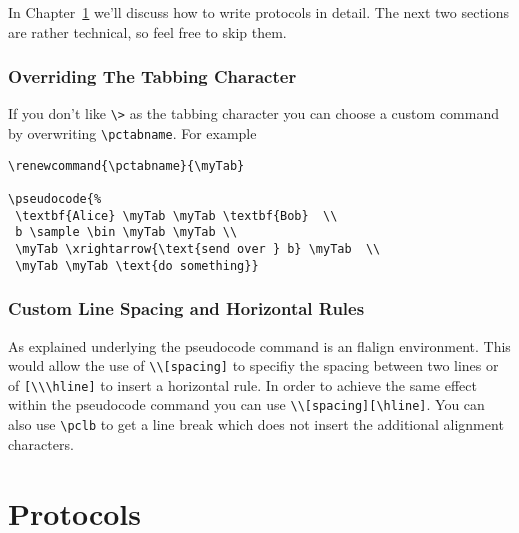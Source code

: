 \documentclass[a4paper]{report}
\begin{document}
In Chapter~\ref{chap:protocols} we'll discuss how to write protocols in detail.
The next two sections are rather technical, so feel free to skip them.


\subsection{Overriding The Tabbing Character}
If you don't like \lstinline$\>$ as the tabbing character you can choose a custom command by overwriting \lstinline$\pctabname$.
For example
\begin{lstlisting}
\renewcommand{\pctabname}{\myTab}

\pseudocode{%
 \textbf{Alice} \myTab \myTab \textbf{Bob}  \\
 b \sample \bin \myTab \myTab \\
 \myTab \xrightarrow{\text{send over } b} \myTab  \\
 \myTab \myTab \text{do something}}
\end{lstlisting}

\subsection{Custom Line Spacing and Horizontal Rules}
As explained underlying the pseudocode command is an flalign environment. This would allow the use
of \lstinline$\\[spacing]$ to specifiy the spacing between two lines or of \lstinline$[\\\hline]$ 
to insert a horizontal rule. In order to achieve the same effect within the pseudocode command you
can use \lstinline$\\[spacing][\hline]$. You can also use \lstinline$\pclb$ to get a line break which
does not insert the additional alignment characters. 

\chapter{Protocols}
\label{chap:protocols}
\end{document}
